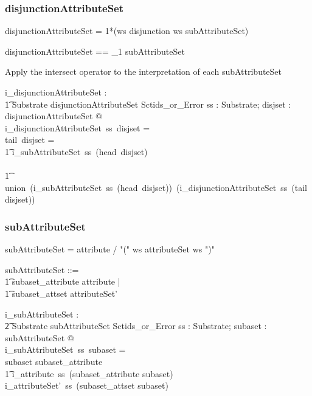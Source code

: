 \documentclass{article}
\def\bnf#1{{\scriptsize {{#1}} }}
\begin{document}
\subsubsection{disjunctionAttributeSet}
\begin{framed}
\noindent
\bnf{disjunctionAttributeSet = 1*(ws disjunction ws subAttributeSet)}
\end{framed}

\begin{zed}
disjunctionAttributeSet == \seq_1 subAttributeSet 
\end{zed}


Apply the intersect operator to the interpretation of each  subAttributeSet

\begin{gendef}
    i\_disjunctionAttributeSet : \\
\t1 Substrate \fun disjunctionAttributeSet \fun Sctids\_or\_Error
\where
   \forall ss : Substrate;  disjset : disjunctionAttributeSet @ \\
   i\_disjunctionAttributeSet~ss~disjset = ~ \\
   \IF tail~disjset = \langle \rangle \\
\t1 \THEN i\_subAttributeSet~ss~(head~disjset) \\
\ELSE \\
\t1 union~(i\_subAttributeSet~ss~(head~disjset))~(i\_disjunctionAttributeSet~ss~(tail~disjset))
\end{gendef}

\subsubsection{subAttributeSet}
\begin{framed}
\noindent
\bnf{subAttributeSet = attribute / "(" ws attributeSet ws ")"}
\end{framed}

\begin{zed}
subAttributeSet ::= \\
\t1 subaset\_attribute \ldata attribute \rdata | \\
\t1 subaset\_attset \ldata attributeSet' \rdata
\end{zed}

\begin{gendef}
   i\_subAttributeSet : \\
\t2 Substrate \fun subAttributeSet \fun Sctids\_or\_Error
\where
   \forall ss : Substrate; subaset : subAttributeSet @ \\
   i\_subAttributeSet~ss~subaset = \\
   \IF subaset \in \ran subaset\_attribute \\
\t1 \THEN i\_attribute~ss~(subaset\_attribute \inv subaset) \\
  \ELSE i\_attributeSet'~ss~(subaset\_attset \inv subaset)
\end{gendef}
\end{document}
